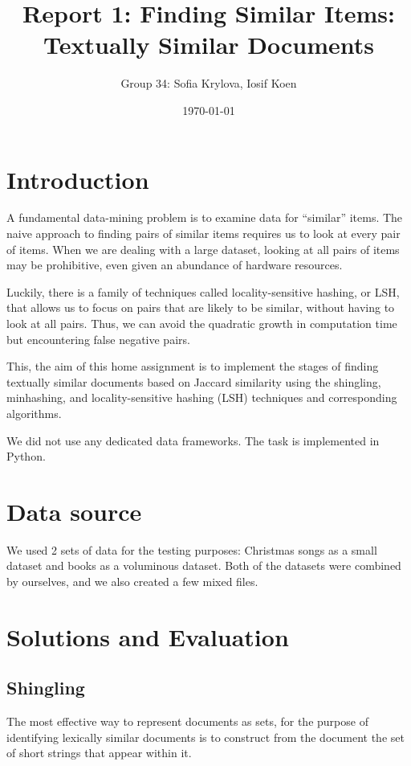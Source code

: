 \documentclass[a4paper, 11pt]{article}
\title{Report 1: Finding Similar Items: Textually Similar Documents}
\author{Group 34: Sofia Krylova, Iosif Koen}
\date{\today{}}
\begin{document}
\maketitle

\section{Introduction}

A fundamental data-mining problem is to examine data for “similar” items. The naive approach to finding pairs of similar items requires us to look at every pair of items. When we are dealing with a large dataset, looking at all pairs of items may be prohibitive, even given an abundance of hardware resources.

Luckily, there is a family of techniques called locality-sensitive hashing, or LSH, that allows us to focus on pairs that are likely to be similar, without having to look at all pairs. Thus, we can avoid the quadratic growth in computation time but encountering false negative pairs.

This, the aim of this home assignment is to implement the stages of finding textually similar documents based on Jaccard similarity using the shingling, minhashing, and locality-sensitive hashing (LSH) techniques and corresponding algorithms. 

We did not use any dedicated data frameworks. The task is implemented in Python.

\section{Data source}

We used 2 sets of data for the testing purposes:  Christmas songs as a small dataset and books as a voluminous dataset.
Both of the datasets were combined by ourselves, and we also created a few mixed files. 

\section{Solutions and Evaluation}
\subsection{Shingling}

The most effective way to represent documents as sets, for the purpose of identifying lexically similar documents is to construct from the document the set of short strings that appear within it.
\end{document}
